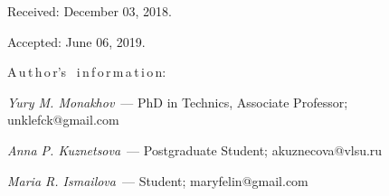 {\vskip1.5mm Received:  December 03, 2018.

Accepted: June 06, 2019.


\vskip6mm A\,u\,t\,h\,o\,r's \ i\,n\,f\,o\,r\,m\,a\,t\,i\,o\,n:%

\vskip2mm \textit{Yury M. Monakhov}~--- PhD in Technics, Associate
Professor;  unklefck@gmail.com

\vskip2mm \textit{Anna P. Kuznetsova}~--- Postgraduate Student;
akuznecova@vlsu.ru

\vskip2mm \textit{Maria R. Ismailova}~--- Student;
maryfelin@gmail.com

}
